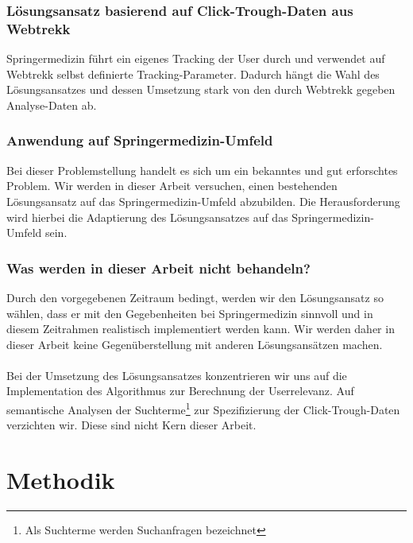 \subsubsection{Lösungsansatz basierend auf Click-Trough-Daten aus Webtrekk}
\label{sec:Einfuehrung:ZielArbeit:AbbildungSpringermedizinUmfeld:Loesungsansatz}

Springermedizin führt ein eigenes Tracking der User durch und verwendet auf Webtrekk selbst definierte Tracking-Parameter. Dadurch hängt die Wahl des Lösungsansatzes und dessen Umsetzung stark von den durch Webtrekk gegeben Analyse-Daten ab.

\subsubsection{Anwendung auf Springermedizin-Umfeld}
\label{sec:Einfuehrung:ZielArbeit:AbbildungSpringermedizinUmfeld:Adaptierung}

Bei dieser Problemstellung handelt es sich um ein bekanntes und gut erforschtes Problem. Wir werden in dieser Arbeit versuchen, einen bestehenden Lösungsansatz auf das Springermedizin-Umfeld abzubilden. Die Herausforderung wird hierbei die Adaptierung des Lösungsansatzes auf das Springermedizin-Umfeld sein.

\subsubsection{Was werden in dieser Arbeit nicht behandeln?}
\label{sec:Einfuehrung:ZielArbeit:AbbildungSpringermedizinUmfeld:NichtBehandeln}

Durch den vorgegebenen Zeitraum bedingt, werden wir den Lösungsansatz so wählen, dass er mit den Gegebenheiten bei Springermedizin sinnvoll und in diesem Zeitrahmen realistisch implementiert werden kann. Wir werden daher in dieser Arbeit keine Gegenüberstellung mit anderen Lösungsansätzen machen. 
\\
\\
Bei der Umsetzung des Lösungsansatzes konzentrieren wir uns auf die Implementation des Algorithmus zur Berechnung der Userrelevanz. Auf semantische Analysen der Suchterme\footnote{Als Suchterme werden Suchanfragen bezeichnet} zur Spezifizierung der Click-Trough-Daten verzichten wir. Diese sind nicht Kern dieser Arbeit.

\section{Methodik}
\label{sec:Einfuehrung:Methodik}

